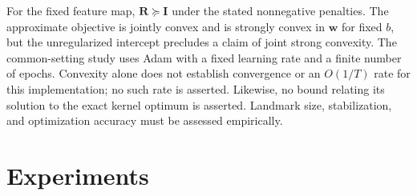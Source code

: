 \documentclass[a4paper]{cas-sc}
\begin{document}
\begin{table}[pos=htbp]
\centering
\caption{\color{blue}Dense arithmetic costs for an interior-point QP implementation and the fixed-feature algorithm. $C_Z$ includes pool and landmark selection.}
\label{tab:complexity}
{\color{blue}}
\end{table}

{\color{blue}For the fixed feature map, $\boldsymbol{R}\succeq\boldsymbol{I}$ under the stated nonnegative penalties. The approximate objective is jointly convex and is strongly convex in $\boldsymbol{w}$ for fixed $b$, but the unregularized intercept precludes a claim of joint strong convexity. The common-setting study uses Adam with a fixed learning rate and a finite number of epochs. Convexity alone does not establish convergence or an $O(1/T)$ rate for this implementation; no such rate is asserted. Likewise, no bound relating its solution to the exact kernel optimum is asserted. Landmark size, stabilization, and optimization accuracy must be assessed empirically.}





\section{Experiments}\label{Experiments}
\end{document}
